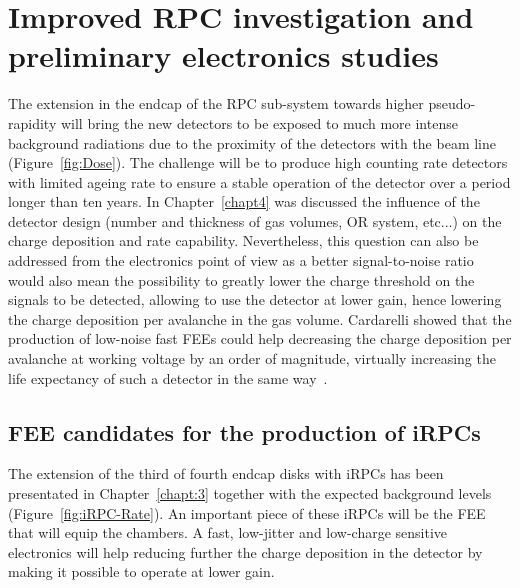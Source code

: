\renewcommand\evenpagerightmark{{\scshape\small Chapter 6}}
\renewcommand\oddpageleftmark{{\scshape\small Improved RPC investigation and preliminary electronics studies}}

\renewcommand{\bibname}{References}

\hyphenation{}

\chapter[Improved RPC investigation and preliminary electronics studies]%
{Improved RPC investigation and preliminary electronics studies}
\label{chapt6}

	The extension in the endcap of the RPC sub-system towards higher pseudo-rapidity will bring the new detectors to be exposed to much more intense background radiations due to the proximity of the detectors with the beam line (Figure~\ref{fig:Dose}). The challenge will be to produce high counting rate detectors with limited ageing rate to ensure a stable operation of the detector over a period longer than ten years. In Chapter~\ref{chapt4} was discussed the influence of the detector design (number and thickness of gas volumes, OR system, etc...) on the charge deposition and rate capability. Nevertheless, this question can also be addressed from the electronics point of view as a better signal-to-noise ratio would also mean the possibility to greatly lower the charge threshold on the signals to be detected, allowing to use the detector at lower gain, hence lowering the charge deposition per avalanche in the gas volume. Cardarelli showed that the production of low-noise fast FEEs could help decreasing the charge deposition per avalanche at working voltage by an order of magnitude, virtually increasing the life expectancy of such a detector in the same way~\cite{CARDARELLI2012}.

\section{FEE candidates for the production of iRPCs}
\label{chapt6:sec:candidates}

	The extension of the third of fourth endcap disks with \acl{iRPC}s has been presentated in Chapter~\ref{chapt:3} together with the expected background levels (Figure~\ref{fig:iRPC-Rate}). An important piece of these iRPCs will be the \acl{FEE} that will equip the chambers. A fast, low-jitter and low-charge sensitive electronics will help reducing further the charge deposition in the detector by making it possible to operate at lower gain.
	
